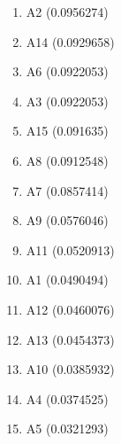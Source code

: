 \begin{enumerate}
\item A2 (0.0956274)
\item A14 (0.0929658)
\item A6 (0.0922053)
\item A3 (0.0922053)
\item A15 (0.091635)
\item A8 (0.0912548)
\item A7 (0.0857414)
\item A9 (0.0576046)
\item A11 (0.0520913)
\item A1 (0.0490494)
\item A12 (0.0460076)
\item A13 (0.0454373)
\item A10 (0.0385932)
\item A4 (0.0374525)
\item A5 (0.0321293)
\end{enumerate}